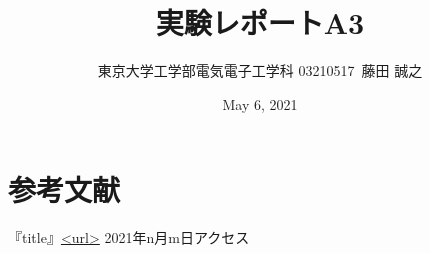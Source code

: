 \documentclass{ltjsarticle}
\title{実験レポートA3}
\author{東京大学工学部電気電子工学科 03210517\ 藤田 誠之 }
\date{May 6, 2021}
\begin{document}
\maketitle

\section{参考文献}
『title』\url{<url>} 2021年n月m日アクセス
\end{document}
